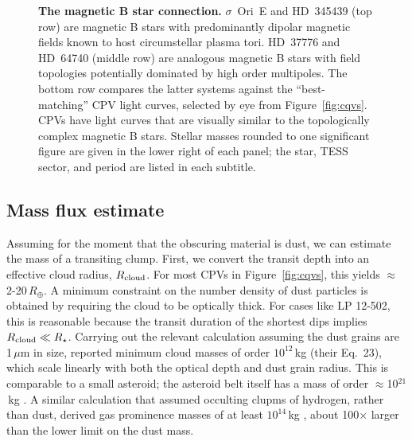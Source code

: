 \documentclass[11pt,twocolumn,tighten]{aastex63}
\begin{document}
\begin{figure}[!th]
	\begin{center}
		\centering
			
		\vspace{-0.35cm}

		\vspace{-0.35cm}

		\vspace{-0.1cm}
		\caption{
      {\bf The magnetic B star connection.}
      $\sigma$~Ori~E and HD~345439 (top row) are magnetic B stars with
      predominantly dipolar magnetic fields known to host
      circumstellar plasma tori.  HD~37776 and HD~64740 (middle row)
      are analogous magnetic B stars with field topologies potentially dominated by
      high order multipoles.  The bottom row compares the latter
      systems against the ``best-matching'' CPV light curves, selected
      by eye from Figure~\ref{fig:cqvs}.  CPVs have light curves that
      are visually similar to the topologically complex magnetic B
      stars.  Stellar masses rounded to one significant figure are
      given in the lower right of each panel; the star, TESS sector,
      and period are listed in each subtitle.
		}
		\label{fig:bstar}
	\end{center}
\end{figure}


\subsection{Mass flux estimate}
\label{subsec:massflux}

Assuming for the moment that the obscuring material is dust, we can
estimate the mass of a transiting clump. First, we convert the transit
depth into an effective cloud radius, $R_{\rm cloud}$.  For most CPVs
in Figure~\ref{fig:cqvs}, this yields $\approx$2-20\,$R_\oplus$.  A
minimum constraint on the number density of dust particles is obtained
by requiring the cloud to be optically thick.  For cases like LP
12-502, this is reasonable because the transit duration of the
shortest dips implies $R_{\rm cloud}\ll R_\star$.  Carrying out the
relevant calculation assuming the dust grains are 1\,$\mu$m in size,
\citet{2023MNRAS.518.4734S} reported minimum cloud masses of order
$10^{12}$\,kg (their Eq.~23), which scale linearly with both the
optical depth and dust grain radius.  This is comparable to a small
asteroid; the asteroid belt itself has a mass of order
$\approx$10$^{21}$\,kg \citep{2019Icar..319..812P}.  A similar
calculation that assumed occulting clupms of hydrogen, rather than
dust, derived gas prominence masses of at least $10^{14}$\,kg
\citep{1990MNRAS.247..415C}, about 100$\times$ larger than the lower
limit on the dust mass.
\end{document}
